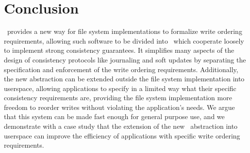 \section{Conclusion}
\label{sec:conclusion}

\Kudos\ provides a new way for file system implementations to formalize write
ordering requirements, allowing such software to be divided into \modules\ which
cooperate loosely to implement strong consistency guarantees. It simplifies many
aspects of the design of consistency protocols like journaling and soft updates
by separating the specification and enforcement of the write ordering
requirements. Additionally, the new abstraction can be extended outside the file
system implementation into userspace, allowing applications to specify in a
limited way what their specific consistency requirements are, providing the file
system implementation more freedom to reorder writes without violating the
application's needs. We argue that this system can be made fast enough for
general purpose use, and we demonstrate with a case study that the extension of
the new \Kudos\ abstraction into userspace can improve the efficiency of
applications with specific write ordering requirements.
